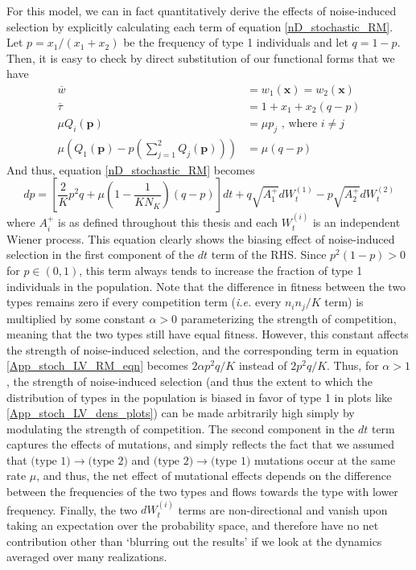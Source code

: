 For this model, we can in fact quantitatively derive the effects of noise-induced selection by explicitly calculating each term of equation \eqref{nD_stochastic_RM}. Let $p = x_1/(x_1 + x_2)$ be the frequency of type 1 individuals and let $q = 1-p$. Then, it is easy to check by direct substitution of our functional forms that we have
\begin{align*}
	\overline{w} &= w_1(\mathbf{x}) = w_2(\mathbf{x})\\
	\overline{\tau} &= 1 + x_1 + x_2(q-p)\\
	\mu Q_i(\mathbf{p}) &= \mu p_{j}\textrm{ , where $i \neq j$}\\
	\mu(Q_1(\mathbf{p}) - p\left(\sum\limits_{j=1}^{2} Q_j(\mathbf{p})\right)) &= \mu(q-p)
\end{align*}
And thus, equation \eqref{nD_stochastic_RM} becomes
\begin{equation}
	\label{App_stoch_LV_RM_eqn}
	dp =  \left[\frac{2}{K}p^2q + \mu\left(1-\frac{1}{KN_K}\right)\left(q-p\right)\right]dt + q\sqrt{A^{+}_1}dW_t^{(1)} - p\sqrt{A^{+}_2}dW_t^{(2)}
\end{equation}
where $A_i^{+}$ is as defined throughout this thesis and each $W^{(i)}_t$ is an independent Wiener process. This equation clearly shows the biasing effect of noise-induced selection in the first component of the $dt$ term of the RHS. Since $p^2(1-p) > 0$ for $p \in (0,1)$, this term always tends to increase the fraction of type 1 individuals in the population. Note that the difference in fitness between the two types remains zero if every competition term (\emph{i.e.} every $n_in_j/K$ term) is multiplied by some constant $\alpha > 0$ parameterizing the strength of competition, meaning that the two types still have equal fitness. However, this constant affects the strength of noise-induced selection, and the corresponding term in equation \ref{App_stoch_LV_RM_eqn} becomes $2\alpha p^2q/K$ instead of $2p^2q/K$. Thus, for $\alpha > 1$, the strength of noise-induced selection (and thus the extent to which the distribution of types in the population is biased in favor of type 1 in plots like \ref{App_stoch_LV_dens_plots}) can be made arbitrarily high simply by modulating the strength of competition. The second component in the $dt$ term captures the effects of mutations, and simply reflects the fact that we assumed that $\textrm{(type }1) \to \textrm{(type }2)$ and $\textrm{(type }2) \to \textrm{(type }1)$ mutations occur at the same rate $\mu$, and thus, the net effect of mutational effects depends on the difference between the frequencies of the two types and flows towards the type with lower frequency. Finally, the two $dW^{(i)}_t$ terms are non-directional and vanish upon taking an expectation over the probability space, and therefore have no net contribution other than `blurring out the results' if we look at the dynamics averaged over many realizations.

